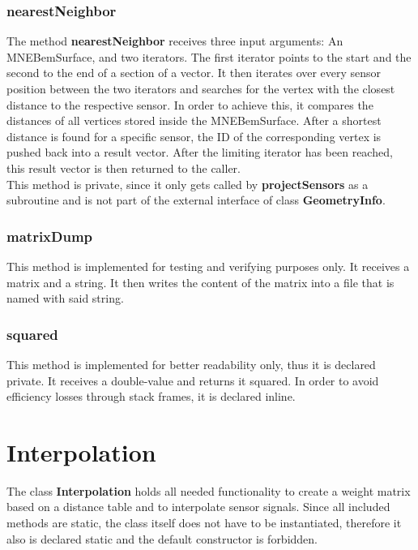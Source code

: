 \clearpage

\subsubsection{nearestNeighbor}
The method \textbf{nearestNeighbor} receives three input arguments: An MNEBemSurface, and two iterators. The first iterator points to the start and the second to the end of a section of a vector.
It then iterates over every sensor position between the two iterators and searches for the vertex with the closest distance to the respective sensor. In order to achieve this, it compares the distances of all vertices stored inside the MNEBemSurface. After a shortest distance is found for a specific sensor, the ID of the corresponding vertex is pushed back into a result vector. After the limiting iterator has been reached, this result vector is then returned to the caller.\\
This method is private, since it only gets called by \textbf{projectSensors} as a subroutine and is not part of the external interface of class \textbf{GeometryInfo}.

\subsubsection{matrixDump}
This method is implemented for testing and verifying purposes only. It receives a matrix and a string. It then writes the content of the matrix into a file that is named with said string.

\subsubsection{squared}
This method is implemented for better readability only, thus it is declared private. It receives a double-value and returns it squared. In order to avoid efficiency losses through stack frames, it is declared inline.

\clearpage


\section{Interpolation}
The class \textbf{Interpolation} holds all needed functionality to create a weight matrix based on a distance table and to interpolate sensor signals. Since all included methods are static, the class itself does not have to be instantiated, therefore it also is declared static and the default constructor is forbidden.

